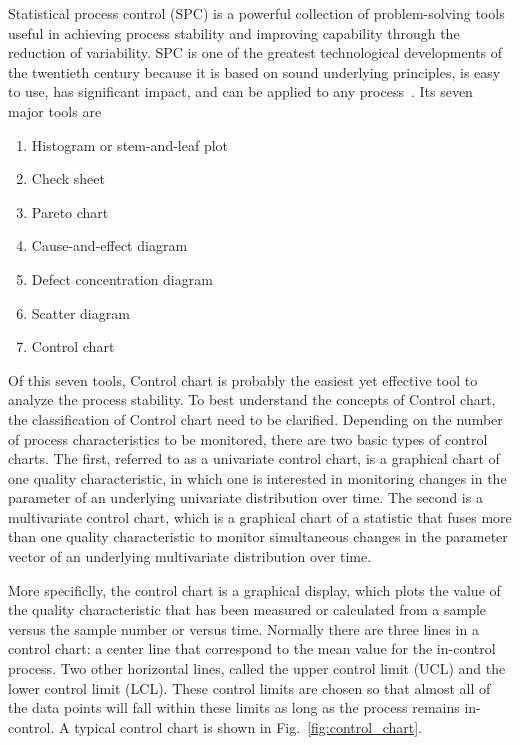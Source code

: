 Statistical process control (SPC) is a powerful collection of problem-solving
tools useful in achieving process stability and improving capability through the reduction of variability.
SPC is one of the greatest technological developments of the twentieth century because it is based on sound underlying principles, is easy to use, has significant impact, and can be applied to any process~\cite{montgomery2020introduction}. Its seven major tools are
\begin{enumerate}
    \item Histogram or stem-and-leaf plot
    \item Check sheet
    \item Pareto chart
    \item Cause-and-effect diagram
    \item Defect concentration diagram
    \item Scatter diagram
    \item Control chart
\end{enumerate}

Of this seven tools, Control chart is probably the easiest yet effective tool to analyze the process stability. To best understand the concepts of Control chart, the classification of Control chart need to be clarified. Depending on the number of process characteristics to be monitored, there are two basic types of control charts. The first, referred to as a univariate control chart, is a graphical chart of one quality characteristic, in which one is interested in monitoring
changes in the parameter of an underlying univariate distribution
over time. The second is a multivariate control chart, which is a graphical chart of a statistic that fuses more than one quality characteristic to monitor simultaneous changes in the parameter
vector of an underlying multivariate distribution over time.


More specificlly, the control chart is a graphical display, which plots the value of the quality characteristic that has been measured or calculated from a sample versus the sample number or versus time. Normally there are three lines in a control chart: a center line that correspond to the mean value for the in-control process. Two other horizontal lines, called the upper control limit (UCL) and the lower control limit (LCL). These control limits are chosen so that almost all of the data points will fall within these limits as long as the process remains in-control. A typical control chart is shown in Fig.~\ref{fig:control_chart}.

